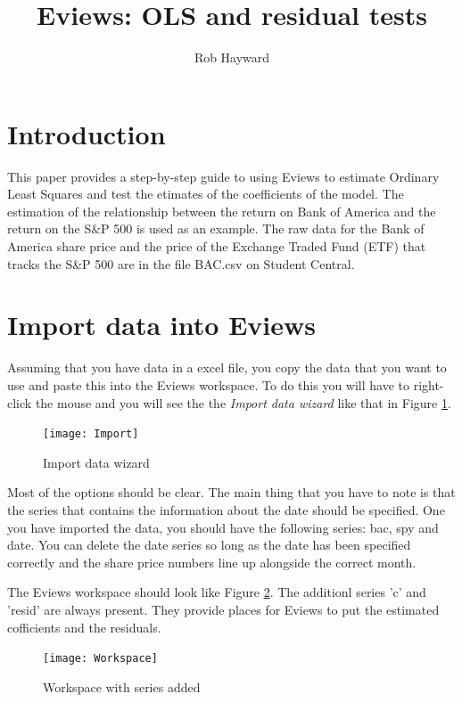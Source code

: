 \documentclass{article}\usepackage{graphicx, color}
\title{Eviews: OLS and residual tests}
\author{Rob Hayward}
\date{}
\begin{document}
\doublespace
\maketitle
\section*{Introduction}
This paper provides a step-by-step guide to using Eviews to estimate Ordinary Least Squares and test the etimates of the coefficients of the model.   The estimation of the relationship between the return on Bank of America and the return on the S\&P 500 is used as an example. The raw data for the Bank of America share price and the price of the Exchange Traded Fund (ETF) that tracks the S\&P 500 are in the file BAC.csv on Student Central. 

\section*{Import data into Eviews}
Assuming that you have data in a excel file, you copy the data that you want to use and paste this into the Eviews workspace. To do this you will have to right-click the mouse and you will see the the \emph{Import data wizard} like that in Figure \ref{import}. 

\begin{figure}[h!]
\graphicspath{{"../Eviews/Figures/"}}
\centering
\texttt{[image: Import]}
\caption{Import data wizard}
\label{import}
\end{figure}

Most of the options should be clear. The main thing that you have to note is that the series that contains the information about the date should be specified.  One you have imported the data, you should have the following series: bac, spy and date.  You can delete the date series so long as the date has been specified correctly and the share price numbers line up alongside the correct month.

The Eviews workspace should look like Figure \ref{WP}.  The additionl series 'c' and 'resid' are always present.  They provide places for Eviews to put the estimated cofficients and the residuals. 

\begin{figure}[h!]
\graphicspath{{"../Eviews/Figures/"}}
\centering
\texttt{[image: Workspace]}
\caption{Workspace with series added}
\label{WP}
\end{figure}
\end{document}
